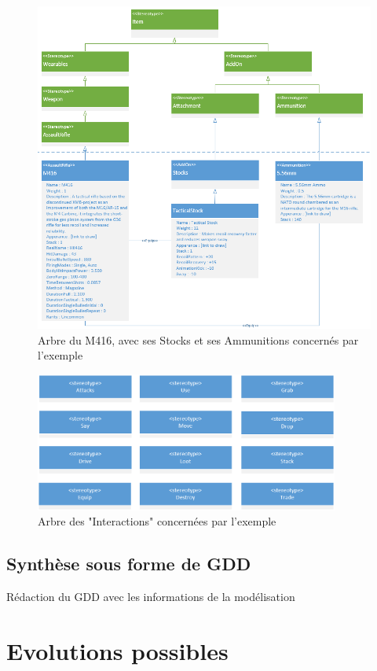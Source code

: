 \begin{figure}[H]
    \centering
    \includegraphics[width=14cm]{10_img/chap6/M416_stock_ammunition_links.PNG} 
    \caption{Arbre du M416, avec ses Stocks et ses Ammunitions concernés par l'exemple}
\end{figure}


\begin{figure}[H]
    \centering
    \includegraphics[width=10cm]{10_img/chap6/interacts.PNG} 
    \caption{Arbre des "Interactions" concernées par l'exemple}
\end{figure}

\subsection{Synthèse sous forme de GDD}
Rédaction du GDD avec les informations de la modélisation

\section{Evolutions possibles}
